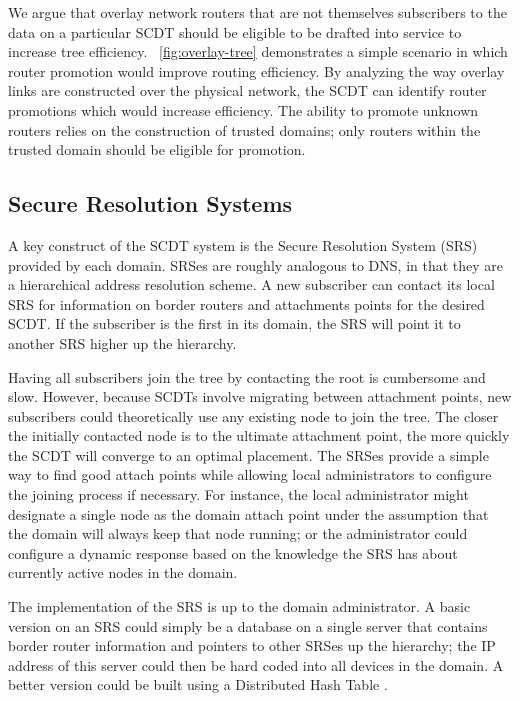 We argue that overlay network routers that are not themselves subscribers to the
data on a particular SCDT should be eligible to be drafted into service to
increase tree efficiency. ~\autoref{fig:overlay-tree} demonstrates a simple 
scenario in which
router promotion would improve routing efficiency.  By analyzing the way overlay
links are constructed over the physical network, the SCDT can identify router
promotions which would increase efficiency.  The ability to promote unknown
routers relies on the construction of trusted domains; only routers within the
trusted domain should be eligible for promotion.

\subsection{Secure Resolution Systems}
\label{sec-resolution-system}

A key construct of the SCDT system is the Secure Resolution System (SRS)
provided by each domain.  SRSes are roughly analogous to DNS, in that they are a
hierarchical address resolution scheme.  A new subscriber can contact its local
SRS for information on border routers and attachments points for the desired
SCDT.  If the subscriber is the first in its domain, the SRS will point it to
another SRS higher up the hierarchy.

Having all subscribers join the tree by contacting the root is cumbersome and slow. However, because SCDTs involve migrating between attachment points, new subscribers could theoretically use any existing node to join the tree. The closer the initially contacted node is to the ultimate attachment point, the more quickly the SCDT will converge to an optimal placement. The SRSes provide a simple way to find good attach points while allowing local administrators to configure the joining process if necessary. For instance, the local administrator might designate a single node as the domain attach point under the assumption that the domain will always keep that node running; or the administrator could configure a dynamic response based on the knowledge the SRS has about currently active nodes in the domain.

The implementation of the SRS is up to the domain administrator.  A basic version on an SRS could simply be a database on a single server that contains border router information and pointers to other SRSes up the
hierarchy; the IP address of this server could then be hard coded into all
devices in the domain.  A better version could be built using a Distributed Hash
Table \cite{chord, tapestry}.

